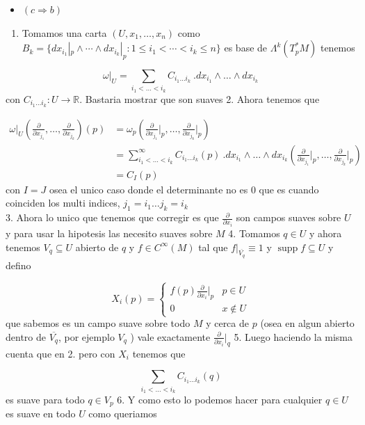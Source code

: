 \begin{bookproof}{}
\begin{itemize}
\item $(c\Rightarrow b)$
\end{itemize}
\begin{enumerate}
\item Tomamos una carta $(U,x_{1},\ldots,x_{n})$ como $B_k=\{dx_{i_1}|_p\wedge\cdots\wedge dx_{i_k}|_p:1\le i_1<\cdots<i_k\le n\}$ es base de $\Lambda^{k}(T_{p}^{*}M)$ tenemos
\end{enumerate}
\[
\omega|_{U}=\sum_{i_{1}<\ldots<i_{k}} C_{i_{1}\ldots i_{k}}\ .dx_{i_{1}}\wedge\ldots\wedge dx_{i_{k}}
\]
con $C_{i_{1}\ldots i_{k}}:U \rightarrow\mathbb{R}$. Bastaria mostrar que son suaves 2. Ahora tenemos que

\[
\begin{aligned}\omega|_{U}\left(\frac{\partial}{\partial x_{j_{1}}},\ldots, \frac{\partial}{\partial x_{j_{k}}}\right)(p)& =\omega_{p}\left(\frac{\partial}{\partial x_{j_{1}}}\bigg|_{p},\ldots, \frac{\partial}{\partial x_{j_{k}}}\bigg|_{p}\right)\\&=\sum^{\infty}_{i_{1}<\ldots<i_{k}}C_{i_{1}\ldots i_{k}}(p) \ .dx_{i_{1}}\wedge\ldots\wedge dx_{i_{k}}\left(\frac{\partial}{\partial x_{j_{1}}}\bigg|_{p},\ldots, \frac{\partial}{\partial x_{j_{k}}}\bigg|_{p}\right)\\&=C_{I}(p)\end{aligned}
\]
con $I=J$ osea el unico caso donde el determinante no es $0$ que es cuando coinciden los multi indices, $j_{1}=i_{1}\ldots j_{k}=i_{k}$\\
3. Ahora lo unico que tenemos que corregir es que $\frac{\partial}{\partial x_{i}}$ son campos suaves sobre $U$  y para usar la hipotesis las necesito suaves sobre $M$ 4. Tomamos $q\in U$ y ahora tenemos $V_{q}\subseteq U$ abierto de $q$ y $f\in C^{\infty}(M)$ tal que $f|_{\overline{V_{q}}}\equiv 1$ y $\operatorname{supp}f\subseteq U$ y defino

\[
X_{i}(p)=\begin{cases} f(p)\frac{\partial}{\partial x_{i}}\bigg|_{p} & p\in U \\0 & x\not\in U \end{cases}
\]
que sabemos es un campo suave sobre todo $M$ y cerca de $p$ (osea en algun abierto dentro de $\overline{V_{q}}$, por ejemplo $V_{q}$ ) vale exactamente $\frac{\partial}{\partial x_{i}}\bigg|_{q}$ 5. Luego haciendo la misma cuenta que en 2. pero con $X_{i}$ tenemos que

\[
\sum_{i_{1}<\ldots<i_{k}} C_{i_{1}\ldots i_{k}}(q)
\]
es suave para todo $q\in V_{p}$ 6. Y como esto lo podemos hacer para cualquier $q\in U$ es suave en todo $U$ como queriamos

\bookqed
\end{bookproof}
